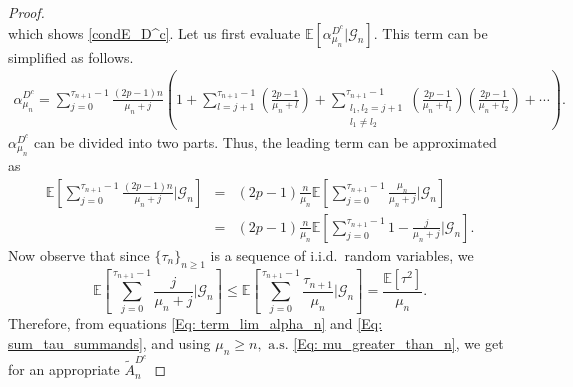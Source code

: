 \documentclass{article}
\numberwithin{equation}{section}
\newcommand{\GG}{\mbox{${\mathcal G}$}}
\newcommand{\sDD}{\tiny{\mbox{${\mathcal D}$}}}
\newcommand{\1}{\mathbf{1}}
\newcommand{\0}{\mathbf{0}}
\newcommand{\E}{\mbox{${\mathbb E}$}}
\begin{document}
\begin{proof}
\[\]
which shows \eqref{condE_D^c}. 
Let us first evaluate $ \E[\alpha_{\mu_n}^{D^c} \vert \GG_n]$. This term can be simplified as follows. 
\begin{eqnarray*}
   \alpha_{\mu_n}^{D^c}= \sum_{j=0}^{\tau_{n+1}-1} \frac{(2p-1)n}{\mu_n+j}\left(1+\sum_{l=j+1}^{\tau_{n+1}-1} \left(\frac{2p-1}{\mu_n+l} \right) +\sum_{\substack{l_1, l_2 = j+1 \\ l_1\neq l_2}}^{\tau_{n+1}-1} \left(\frac{2p-1}{\mu_n+l_1} \right)\left(\frac{2p-1}{\mu_n+l_2} \right)+\cdots\right).
\end{eqnarray*}
$\alpha_{\mu_n}^{D^c}$ can be divided into two parts. Thus, the leading term can be approximated as 
\begin{eqnarray}
\label{Eq: term_lim_alpha_n}
\E\left[\sum_{j=0}^{\tau_{n+1}-1} \frac{(2p-1)n}{\mu_n+j} \Big\vert \GG_n\right] &=& (2p-1)\frac{n}{\mu_n} \E\left[\sum_{j=0}^{\tau_{n+1}-1} \frac{\mu_n}{\mu_n+j} \Big\vert \GG_n\right] \nonumber\\
&=&  (2p-1)\frac{n}{\mu_n}\E\left[\sum_{j=0}^{\tau_{n+1}-1} 1-\frac{j}{\mu_n+j} \Big\vert \GG_n\right].
\end{eqnarray}
Now observe that since $\{\tau_n\}_{n \ge 1}$ is a sequence of i.i.d.\, random variables, we
\begin{equation}
\label{Eq: sum_tau_summands}
\E\left[\sum_{j=0}^{\tau_{n+1}-1} \frac{j}{\mu_n+j} \Big\vert \GG_n\right] \le \E\left[\sum_{j=0}^{\tau_{n+1}-1} \frac{\tau_{n+1}}{\mu_n} \Big\vert \GG_n\right]= \frac{\E \left[\tau^2\right]}{\mu_n}.
\end{equation}
Therefore, from equations \eqref{Eq: term_lim_alpha_n} and \eqref{Eq: sum_tau_summands}, and using $\mu_n \ge n, \text{ a.s.}$ \eqref{Eq: mu_greater_than_n}, we get for an appropriate $\tilde{A}_n^{D^c}$

\end{proof}
\end{document}
